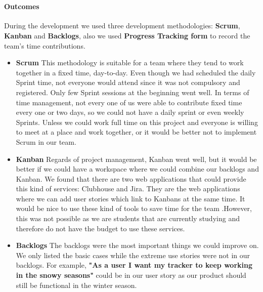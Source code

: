\documentclass[12pt,a4paper]{article}
\begin{document}
        \paragraph{Outcomes}During the development we used three development methodologies: {\bf Scrum}, {\bf Kanban} and {\bf Backlogs}, also we used {\bf Progress Tracking form} to record the team's time contributions.

        \begin{itemize}
          \item {\bf Scrum} This methodology is suitable for a team where they tend to work together in a fixed time, day-to-day. Even though we had scheduled the daily Sprint time, not everyone would attend since it was not compulsory and registered. Only few Sprint sessions at the beginning went well. In terms of time management, not every one of us were able to contribute fixed time every one or two days, so we could not have a daily sprint or even weekly Sprints. Unless we could work full time on this project and everyone is willing to meet at a place and work together, or it would be better not to implement Scrum in our team. 
          
          \item {\bf Kanban} Regards of project management, Kanban went well, but it would be better if we could have a workspace where we could combine our backlogs and Kanban. We found that there are two web applications that could provide this kind of services: Clubhouse and Jira. They are the web applications where we can add user stories which link to Kanbans at the same time. It would be nice to use these kind of tools to save time for the team .However, this was not possible as we are students that are currently studying and therefore do not have the budget to use these services.
        
          \item {\bf Backlogs} The backlogs were the most important things we could improve on. We only listed the basic cases while the extreme use stories were not in our backlogs. For example, {\bf "As a user I want my tracker to keep working in the snowy seasons"} could be in our user story as our product should still be functional in the winter season.


\end{itemize}
\end{document}
